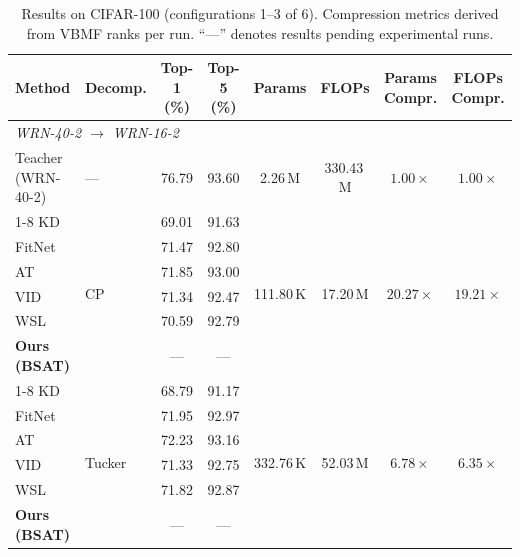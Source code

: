 \documentclass[conference]{IEEEtran}
\begin{document}
\begin{table}[t]
  \centering
  \caption{Results on CIFAR-100 (configurations 1--3 of 6).
    Compression metrics derived from VBMF ranks per run.
    ``—'' denotes results pending experimental runs.}
  \label{tab:cifar100_a}
  \setlength{\tabcolsep}{4pt}
  \begin{tabular}{llcccccc}
    \toprule
    \textbf{Method} & \textbf{Decomp.} &
    \textbf{Top-1 (\%)} & \textbf{Top-5 (\%)} &
    \textbf{Params} & \textbf{FLOPs} &
    \textbf{Params Compr.} & \textbf{FLOPs Compr.} \\
    \midrule

    \multicolumn{8}{l}{\textit{WRN-40-2 $\to$ WRN-16-2}} \\
    \midrule
    Teacher (WRN-40-2)   & — & 76.79 & 93.60 & 2.26\,M & 330.43\,M & $1.00\times$ & $1.00\times$ \\
    \cline{1-8}
    KD \cite{hinton2015distilling}                 & \multirow{6}{*}{CP}     & 69.01 & 91.63 & \multirow{6}{*}{111.80\,K} & \multirow{6}{*}{17.20\,M} & \multirow{6}{*}{$20.27\times$} & \multirow{6}{*}{$19.21\times$} \\
    FitNet \cite{romero2015fitnetshintsdeepnets}   &                         & 71.47 & 92.80 & & & & \\
    AT \cite{zagoruyko2016paying}                  &                         & 71.85 & 93.00 & & & & \\
    VID \cite{ahn2019variational}                  &                         & 71.34 & 92.47 & & & & \\
    WSL \cite{zhou2021rethinking}                  &                         & 70.59 & 92.79 & & & & \\
    \textbf{Ours (BSAT)}                           &                         & — & — & & & & \\
    \cline{1-8}
    KD \cite{hinton2015distilling}                 & \multirow{6}{*}{Tucker} & 68.79 & 91.17 & \multirow{6}{*}{332.76\,K} & \multirow{6}{*}{52.03\,M} & \multirow{6}{*}{$6.78\times$} & \multirow{6}{*}{$6.35\times$} \\
    FitNet \cite{romero2015fitnetshintsdeepnets}   &                         & 71.95 & 92.97 & & & & \\
    AT \cite{zagoruyko2016paying}                  &                         & 72.23 & 93.16 & & & & \\
    VID \cite{ahn2019variational}                  &                         & 71.33 & 92.75 & & & & \\
    WSL \cite{zhou2021rethinking}                  &                         & 71.82 & 92.87 & & & & \\
    \textbf{Ours (BSAT)}                           &                         & — & — & & & & \\
    \midrule


\end{tabular}
\end{table}
\end{document}
